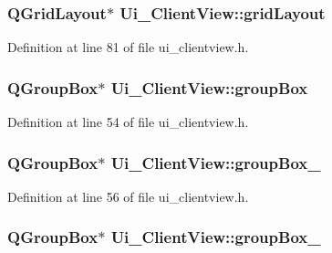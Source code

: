 \subsubsection[{grid\+Layout}]{\setlength{\rightskip}{0pt plus 5cm}Q\+Grid\+Layout$\ast$ Ui\+\_\+\+Client\+View\+::grid\+Layout}\label{class_ui___client_view_ab9f0b12942ece16be12503604c116b74}


Definition at line 81 of file ui\+\_\+clientview.\+h.

\hypertarget{class_ui___client_view_a46eed96a14ad721dae7862940196b453}{}
\subsubsection[{group\+Box}]{\setlength{\rightskip}{0pt plus 5cm}Q\+Group\+Box$\ast$ Ui\+\_\+\+Client\+View\+::group\+Box}\label{class_ui___client_view_a46eed96a14ad721dae7862940196b453}


Definition at line 54 of file ui\+\_\+clientview.\+h.

\hypertarget{class_ui___client_view_aa24822bd6d8f9870252856fb270e7c81}{}
\subsubsection[{group\+Box\+\_\+2}]{\setlength{\rightskip}{0pt plus 5cm}Q\+Group\+Box$\ast$ Ui\+\_\+\+Client\+View\+::group\+Box\+\_}\label{class_ui___client_view_aa24822bd6d8f9870252856fb270e7c81}


Definition at line 56 of file ui\+\_\+clientview.\+h.

\hypertarget{class_ui___client_view_a02e54e94498bea8c809e2c45c447b62e}{}
\subsubsection[{group\+Box\+\_\+3}]{\setlength{\rightskip}{0pt plus 5cm}Q\+Group\+Box$\ast$ Ui\+\_\+\+Client\+View\+::group\+Box\+\_}\label{class_ui___client_view_a02e54e94498bea8c809e2c45c447b62e}



